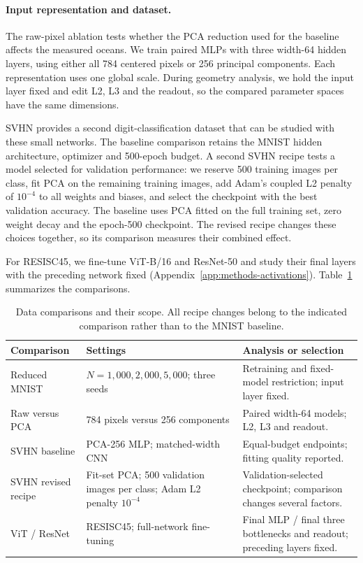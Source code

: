 \paragraph{Input representation and dataset.}
The raw-pixel ablation tests whether the PCA reduction used for the baseline affects the measured oceans. We train paired MLPs with three width-64 hidden layers, using either all 784 centered pixels or 256 principal components. Each representation uses one global scale. During geometry analysis, we hold the input layer fixed and edit L2, L3 and the readout, so the compared parameter spaces have the same dimensions.

SVHN \citep{netzer2011svhn} provides a second digit-classification dataset that can be studied with these small networks. The baseline comparison retains the MNIST hidden architecture, optimizer and 500-epoch budget. A second SVHN recipe tests a model selected for validation performance: we reserve 500 training images per class, fit PCA on the remaining training images, add Adam's coupled L2 penalty of $10^{-4}$ to all weights and biases, and select the checkpoint with the best validation accuracy. The baseline uses PCA fitted on the full training set, zero weight decay and the epoch-500 checkpoint. The revised recipe changes these choices together, so its comparison measures their combined effect.

For RESISC45, we fine-tune ViT-B/16 and ResNet-50 and study their final layers with the preceding network fixed (Appendix~\ref{app:methods-activations}). Table~\ref{tab:early-method-data} summarizes the comparisons.

\begin{table}[!htbp]\centering
\caption{Data comparisons and their scope. All recipe changes belong to the indicated comparison rather than to the MNIST baseline.}\label{tab:early-method-data}
\small\begin{tabular}{p{.24\linewidth}p{.32\linewidth}p{.34\linewidth}}\toprule
Comparison & Settings & Analysis or selection\\\midrule
Reduced MNIST & $N=1{,}000,2{,}000,5{,}000$; three seeds & Retraining and fixed-model restriction; input layer fixed.\\
Raw versus PCA & 784 pixels versus 256 components & Paired width-64 models; L2, L3 and readout.\\
SVHN baseline & PCA-256 MLP; matched-width CNN & Equal-budget endpoints; fitting quality reported.\\
SVHN revised recipe & Fit-set PCA; 500 validation images per class; Adam L2 penalty $10^{-4}$ & Validation-selected checkpoint; comparison changes several factors.\\
ViT / ResNet & RESISC45; full-network fine-tuning & Final MLP / final three bottlenecks and readout; preceding layers fixed.\\\bottomrule
\end{tabular}
\end{table}



